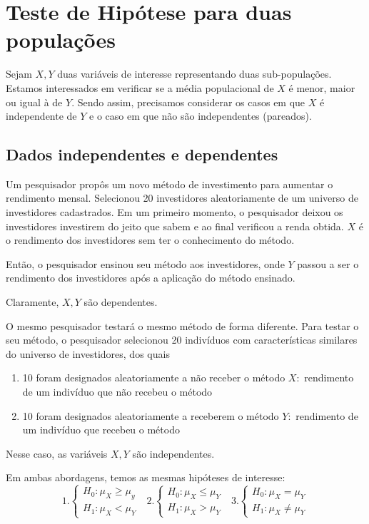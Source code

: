 \documentclass[
  letterpaper,
  DIV=11,
  numbers=noendperiod]{scrreprt}
\begin{document}

\chapter{Teste de Hipótese para duas
populações}\label{teste-de-hipuxf3tese-para-duas-populauxe7uxf5es}

Sejam \(X, Y\) duas variáveis de interesse representando duas
sub-populações. Estamos interessados em verificar se a média
populacional de \(X\) é menor, maior ou igual à de \(Y\). Sendo assim,
precisamos considerar os casos em que \(X\) é independente de \(Y\) e o
caso em que não são independentes (pareados).

\section{Dados independentes e
dependentes}\label{dados-independentes-e-dependentes}

Um pesquisador propôs um novo método de investimento para aumentar o
rendimento mensal. Selecionou 20 investidores aleatoriamente de um
universo de investidores cadastrados. Em um primeiro momento, o
pesquisador deixou os investidores investirem do jeito que sabem e ao
final verificou a renda obtida. \(X\) é o rendimento dos investidores
sem ter o conhecimento do método.

Então, o pesquisador ensinou seu método aos investidores, onde \(Y\)
passou a ser o rendimento dos investidores após a aplicação do método
ensinado.

Claramente, \(X,Y\) são dependentes.

O mesmo pesquisador testará o mesmo método de forma diferente. Para
testar o seu método, o pesquisador selecionou 20 indivíduos com
características similares do universo de investidores, dos quais

\begin{enumerate}
\def\labelenumi{\arabic{enumi}.}
\item
  10 foram designados aleatoriamente a não receber o método \(X:\)
  rendimento de um indivíduo que não recebeu o método
\item
  10 foram designados aleatoriamente a receberem o método \(Y:\)
  rendimento de um indivíduo que recebeu o método
\end{enumerate}

Nesse caso, as variáveis \(X,Y\) são independentes.

Em ambas abordagens, temos as mesmas hipóteses de interesse: \[
1.
\begin{cases}
H_{0}:\mu_{X}\geq \mu_{y} \\
H_{1}: \mu_{X} < \mu_{Y}
\end{cases} ~~~2.
\begin{cases}
H_{0}:\mu_{X}\leq \mu_{Y} \\
H_{1}: \mu_{X} > \mu_{Y}
\end{cases} ~~~3.
\begin{cases}
H_{0}:\mu_{X}= \mu_{Y} \\
H_{1}: \mu_{X} \neq \mu_{Y}
\end{cases}
\]
\end{document}
